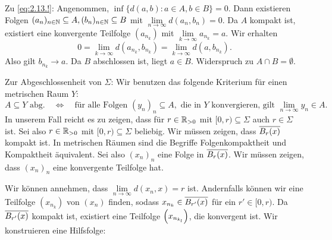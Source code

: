 \begin{beweis}[zu (i)]
\begin{description}
			Zu \eqref{eq:2.13.!}: Angenommen, $\inf\{d(a,b) : a \in A, b \in B\} = 0$. Dann existieren Folgen $(a_n)_{n \in \NN} \subseteq A, (b_n)_{n \in \NN} \subseteq B$ mit $\lim\limits_{n \rightarrow \infty} d(a_n,b_n) = 0$.
			Da $A$ kompakt ist, existiert eine konvergente Teilfolge $(a_{n_k})$ mit $\lim\limits_{k \rightarrow \infty} a_{n_k} = a$.
			Wir erhalten
			\[
				0 = \lim\limits_{k \rightarrow \infty} d(a_{n_k},b_{n_k}) = \lim\limits_{k \rightarrow \infty} d(a,b_{n_k}).
			\]
			Also gilt $b_{n_k} \rightarrow a$.
			Da $B$ abschlossen ist, liegt $a \in B$. Widerspruch zu $A \cap B = \emptyset$.
		\end{description}
		Zur Abgeschlossenheit von $\Sigma$:
		Wir benutzen das folgende Kriterium für einen metrischen Raum $Y$:
		\[
			A \subseteq Y \text{ abg.} \quad \Leftrightarrow \quad \text{für alle Folgen } (y_n)_n \subseteq A, \text{ die in } Y \text{ konvergieren, gilt } \lim\limits_{n \rightarrow \infty} y_n \in A.
		\]
		In unserem Fall reicht es zu zeigen, dass für $r \in \RR_{> 0}$ mit $[0,r) \subseteq \Sigma$ auch $r \in \Sigma$ ist.
		Sei also $r \in \RR_{> 0}$ mit $[0,r) \subseteq \Sigma$ beliebig.
		Wir müssen zeigen, dass $\ol{B_r(x)}$ kompakt ist.
		In metrischen Räumen sind die Begriffe Folgenkompaktheit und Kompaktheit äquivalent.
		Sei also $(x_n)_n$ eine Folge in $\ol{B_r(x)}$.
		Wir müssen zeigen, dass $(x_n)_n$ eine konvergente Teilfolge hat.
		
		Wir können annehmen, dass $\lim\limits_{n \rightarrow \infty} d(x_n,x) = r$ ist. 
		Andernfalls können wir eine Teilfolge $(x_{n_k})$ von $(x_n)$ finden, sodass $x_{n_k} \in \ol{B_{r'}(x)}$ für ein $r' \in [0,r)$.
		Da $\ol{B_{r'}(x)}$ kompakt ist, existiert eine Teilfolge $\enbrace*{x_{n_{k_l}}}$, die konvergent ist.
		Wir konstruieren eine Hilfsfolge:
		

\end{beweis}
